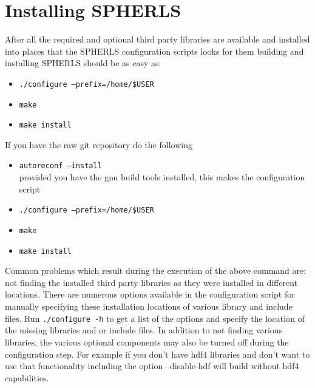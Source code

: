 \documentclass[12pt,a4paper]{book}
\begin{document}

\section{Installing SPHERLS}
After all the required and optional third party libraries are available and installed into places that the SPHERLS configuration scripts looks for them building and installing SPHERLS should be as easy as:
\begin{itemize}
\item {\tt ./configure --prefix=/home/\${USER}}
\item {\tt make}
\item {\tt make install}
\end{itemize}
If you have the raw git repository do the following
\begin{itemize}
\item {\tt autoreconf --install} \\provided you have the gnu build tools installed, this makes the configuration script
\item {\tt ./configure --prefix=/home/\${USER}}
\item {\tt make}
\item {\tt make install}
\end{itemize}
Common problems which result during the execution of the above command are: not finding the installed third party libraries as they were installed in different locations. There are numerous options available in the configuration script for manually specifying these installation locations of various library and include files. Run {\tt ./configure -h} to get a list of the options and specify the location of the missing libraries and or include files. In addition to not finding various libraries, the various optional components may also be turned off during the configuration step. For example if you don't have hdf4 libraries and don't want to use that functionality including the option --disable-hdf will build without hdf4 capabilities.
\end{document}
